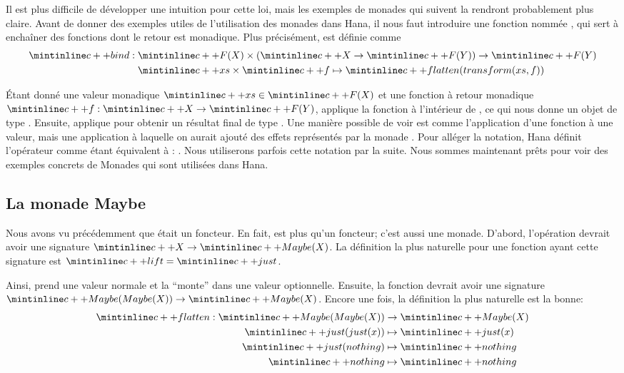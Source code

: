 Il est plus difficile de développer une intuition pour cette loi, mais les
exemples de monades qui suivent la rendront probablement plus claire. Avant
de donner des exemples utiles de l'utilisation des monades dans Hana, il nous
faut introduire une fonction nommée , qui sert à enchaîner des
fonctions dont le retour est monadique. Plus précisément,  est
définie comme
\begin{align*}
    \cc{bind} : \; &\cc{F(X)} \times (\cc{X} \to \cc{F(Y)}) \to \cc{F(Y)} \\
                &\cc{xs} \times \cc{f} \mapsto \cc{flatten(transform(xs, f))}
\end{align*}

Étant donné une valeur monadique $\cc{xs} \in \cc{F(X)}$ et une fonction à
retour monadique $\cc{f} : \cc{X} \to \cc{F(Y)}$,  applique la
fonction  à l'intérieur de , ce qui nous donne un objet de
type . Ensuite,  applique  pour obtenir
un résultat final de type . Une manière possible de voir 
est comme l'application d'une fonction à une valeur, mais une application
à laquelle on aurait ajouté des effets représentés par la monade .
Pour alléger la notation, Hana définit l'opérateur  comme
étant équivalent à : . Nous utiliserons
parfois cette notation par la suite. Nous sommes maintenant prêts pour voir
des exemples concrets de Monades qui sont utilisées dans Hana.


\subsection{La monade Maybe}
Nous avons vu précédemment que  était un foncteur. En fait,
 est plus qu'un foncteur; c'est aussi une monade. D'abord,
l'opération  devrait avoir une signature $\cc{X} \to \cc{Maybe(X)}$.
La définition la plus naturelle pour une fonction ayant cette signature est
$\cc{lift} = \cc{just}$.

Ainsi,  prend une valeur normale et la ``monte'' dans une valeur
optionnelle. Ensuite, la fonction  devrait avoir une signature
$\cc{Maybe(Maybe(X))} \to \cc{Maybe(X)}$. Encore une fois, la définition la
plus naturelle est la bonne:
\begin{align*}
    \cc{flatten} : \cc{Maybe(Maybe(X))} &\to \cc{Maybe(X)} \\
    \cc{just(just(x))} &\mapsto \cc{just(x)} \\
    \cc{just(nothing)} &\mapsto \cc{nothing} \\
    \cc{nothing} &\mapsto \cc{nothing}
\end{align*}

